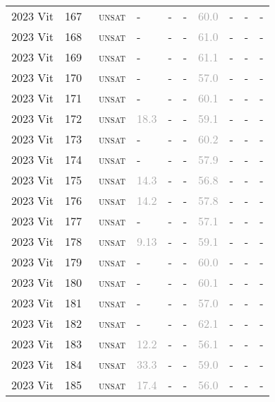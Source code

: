 \begin{center}
{\begin{longtable}{@{}llllllllll@{}}
2023 Vit & 167 & ~\textsc{unsat} & - & - & - & \textcolor{darkgray}{60.0} & - & - & - \\
2023 Vit & 168 & ~\textsc{unsat} & - & - & - & \textcolor{darkgray}{61.0} & - & - & - \\
2023 Vit & 169 & ~\textsc{unsat} & - & - & - & \textcolor{darkgray}{61.1} & - & - & - \\
2023 Vit & 170 & ~\textsc{unsat} & - & - & - & \textcolor{darkgray}{57.0} & - & - & - \\
2023 Vit & 171 & ~\textsc{unsat} & - & - & - & \textcolor{darkgray}{60.1} & - & - & - \\
2023 Vit & 172 & ~\textsc{unsat} & \textcolor{darkgray}{18.3} & - & - & \textcolor{darkgray}{59.1} & - & - & - \\
2023 Vit & 173 & ~\textsc{unsat} & - & - & - & \textcolor{darkgray}{60.2} & - & - & - \\
2023 Vit & 174 & ~\textsc{unsat} & - & - & - & \textcolor{darkgray}{57.9} & - & - & - \\
2023 Vit & 175 & ~\textsc{unsat} & \textcolor{darkgray}{14.3} & - & - & \textcolor{darkgray}{56.8} & - & - & - \\
2023 Vit & 176 & ~\textsc{unsat} & \textcolor{darkgray}{14.2} & - & - & \textcolor{darkgray}{57.8} & - & - & - \\
2023 Vit & 177 & ~\textsc{unsat} & - & - & - & \textcolor{darkgray}{57.1} & - & - & - \\
2023 Vit & 178 & ~\textsc{unsat} & \textcolor{darkgray}{9.13} & - & - & \textcolor{darkgray}{59.1} & - & - & - \\
2023 Vit & 179 & ~\textsc{unsat} & - & - & - & \textcolor{darkgray}{60.0} & - & - & - \\
2023 Vit & 180 & ~\textsc{unsat} & - & - & - & \textcolor{darkgray}{60.1} & - & - & - \\
2023 Vit & 181 & ~\textsc{unsat} & - & - & - & \textcolor{darkgray}{57.0} & - & - & - \\
2023 Vit & 182 & ~\textsc{unsat} & - & - & - & \textcolor{darkgray}{62.1} & - & - & - \\
2023 Vit & 183 & ~\textsc{unsat} & \textcolor{darkgray}{12.2} & - & - & \textcolor{darkgray}{56.1} & - & - & - \\
2023 Vit & 184 & ~\textsc{unsat} & \textcolor{darkgray}{33.3} & - & - & \textcolor{darkgray}{59.0} & - & - & - \\
2023 Vit & 185 & ~\textsc{unsat} & \textcolor{darkgray}{17.4} & - & - & \textcolor{darkgray}{56.0} & - & - & - \\

\end{longtable}}
\end{center}
